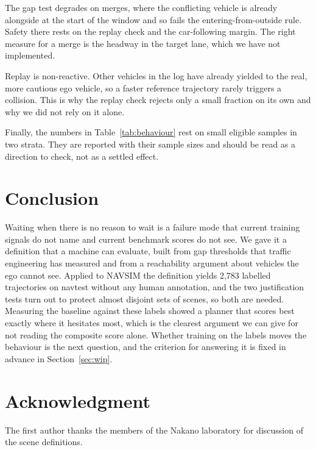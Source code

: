 \documentclass[conference]{IEEEtran}
\begin{document}
The gap test degrades on merges, where the conflicting vehicle is already
alongside at the start of the window and so fails the entering-from-outside
rule. Safety there rests on the replay check and the car-following margin. The
right measure for a merge is the headway in the target lane, which we have not
implemented.

Replay is non-reactive. Other vehicles in the log have already yielded to the
real, more cautious ego vehicle, so a faster reference trajectory rarely
triggers a collision. This is why the replay check rejects only a small
fraction on its own and why we did not rely on it alone.

Finally, the numbers in Table~\ref{tab:behaviour} rest on small eligible
samples in two strata. They are reported with their sample sizes and should be
read as a direction to check, not as a settled effect.

\section{Conclusion}

Waiting when there is no reason to wait is a failure mode that current training
signals do not name and current benchmark scores do not see. We gave it a
definition that a machine can evaluate, built from gap thresholds that traffic
engineering has measured and from a reachability argument about vehicles the ego
cannot see. Applied to NAVSIM the definition yields 2{,}783 labelled
trajectories on navtest without any human annotation, and the two justification
tests turn out to protect almost disjoint sets of scenes, so both are needed.
Measuring the baseline against these labels showed a planner that scores best
exactly where it hesitates most, which is the clearest argument we can give for
not reading the composite score alone. Whether training on the labels moves the
behaviour is the next question, and the criterion for answering it is fixed in
advance in Section~\ref{sec:wip}.

\section*{Acknowledgment}
The first author thanks the members of the Nakano laboratory for discussion of
the scene definitions.



\end{document}

